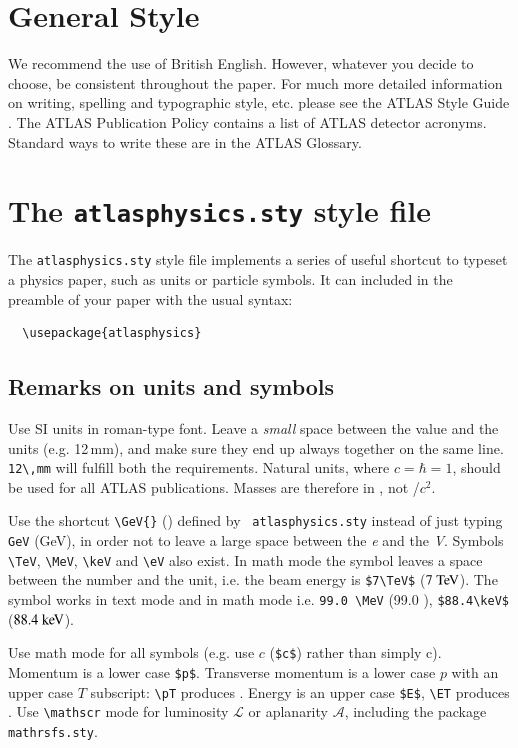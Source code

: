 \documentclass[11pt,a4paper]{atlasnote}
\begin{document}
\section{General Style}

We recommend the use of British English. However, whatever you decide
to choose, be consistent throughout the paper. For much more detailed
information on writing, spelling and typographic style, etc. please
see the ATLAS Style Guide \cite{}. The ATLAS Publication Policy
contains a list of ATLAS detector acronyms. Standard ways to write
these are in the ATLAS Glossary.

\section{The {\tt atlasphysics.sty} style file}
\label{app:AtlasPhysicsSty}

The {\tt atlasphysics.sty} style file implements a series of useful
shortcut to typeset a physics paper, such as units or particle
symbols. It can included in the preamble of your paper with the usual
syntax:

\begin{verbatim}
  \usepackage{atlasphysics}
\end{verbatim}

\subsection{Remarks on units and symbols}

Use SI units in roman-type font. Leave a \emph{small} space between
the value and the units (e.g. 12\,mm), and make sure they end up
always together on the same line. \verb|12\,mm| will fulfill both the
requirements. Natural units, where $c=\hbar=1$, should be used for all
ATLAS publications. Masses are therefore in \GeV, not \GeV/$c^2$.

Use the shortcut \verb|\GeV{}| (\GeV{}) defined by {\tt
atlasphysics.sty} instead of just typing \verb|GeV| (GeV), in order
not to leave a large space between the \emph{e} and the
\emph{V}. Symbols \verb|\TeV|, \verb|\MeV|, \verb|\keV| and \verb|\eV|
also exist. In math mode the symbol leaves a space between the number
and the unit, i.e. the beam energy is \verb+$7\TeV$+ ($7\TeV$). The
symbol works in text mode and in math mode i.e. \verb+99.0 \MeV+
(99.0 \MeV), \verb+$88.4\keV$+ ($88.4\keV$).

Use math mode for all symbols (e.g. use $c$ (\verb|$c$|) rather than
simply c). Momentum is a lower case \verb+$p$+. Transverse momentum is
a lower case $p$ with an upper case $T$ subscript: \verb|\pT| produces
\pT. Energy is an upper case \verb+$E$+, \verb+\ET+ produces \ET.  Use
\verb|\mathscr| mode for luminosity $\mathscr{L}$ or aplanarity
$\mathscr{A}$, including the package \verb|mathrsfs.sty|.
\end{document}
